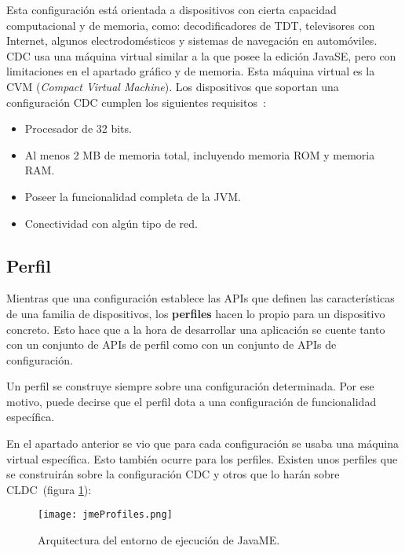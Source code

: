 \begin{itemize}
Esta configuración está orientada a dispositivos con cierta capacidad
computacional y de memoria, como: decodificadores de \acs{TDT}, televisores con
Internet, algunos electrodomésticos y sistemas de navegación en automóviles.
\acs{CDC} usa una máquina virtual similar a la que posee la edición
\acs{JavaSE}, pero con limitaciones en el apartado gráfico y de memoria. Esta 
máquina virtual es la \acs{CVM} (\emph{Compact Virtual Machine}).
Los dispositivos que soportan una configuración \acs{CDC} cumplen los
siguientes requisitos~\cite{bib:j2me}:
\begin{itemize}
  \item Procesador de 32 bits.
  \item Al menos 2 MB de memoria total, incluyendo memoria \acs{ROM} y
  memoria \acs{RAM}.
  \item Poseer la funcionalidad completa de la \acs{JVM}.
  \item Conectividad con algún tipo de red.
\end{itemize}
\end{itemize}

\subsection{Perfil}
Mientras que una configuración establece las \acs{API}s que definen las 
características de una familia de dispositivos, los \textbf{perfiles} hacen
lo propio para un dispositivo concreto. Esto hace que a la hora de
desarrollar una aplicación se cuente tanto con un conjunto de \acs{API}s 
de perfil como con un conjunto de \acs{API}s de configuración.

Un perfil se construye siempre sobre una configuración determinada. Por ese
motivo, puede decirse que el perfil dota a una configuración de funcionalidad
específica.

En el apartado anterior se vio que para cada configuración se usaba una
máquina virtual específica. Esto también ocurre para los perfiles. Existen
unos perfiles que se construirán sobre la configuración \acs{CDC} y otros
que lo harán sobre \acs{CLDC}~\cite{bib:j2me}(figura \ref{fig:jmeProfiles}):

  \begin{figure}[H]
    \begin{center}
      \texttt{[image: jmeProfiles.png]}
      \caption{Arquitectura del entorno de ejecución de \acs{JavaME}.}
      \label{fig:jmeProfiles}
    \end{center}
  \end{figure}


